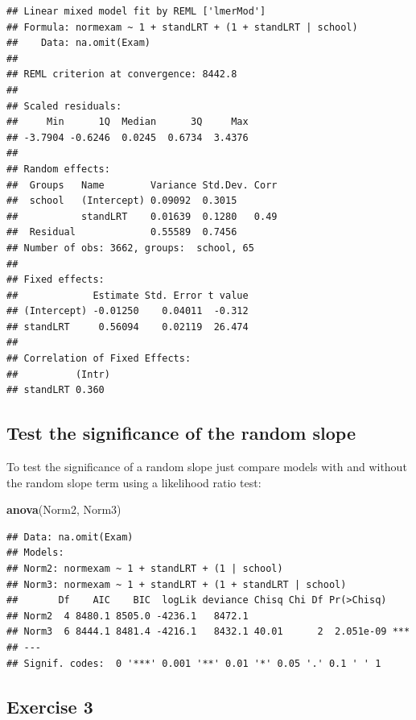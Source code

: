 \documentclass[]{book}
\newenvironment{Shaded}{\begin{snugshade}}{\end{snugshade}}
\newcommand{\KeywordTok}[1]{\textcolor[rgb]{0.13,0.29,0.53}{\textbf{#1}}}
\newcommand{\NormalTok}[1]{#1}
\begin{document}
\begin{verbatim}
## Linear mixed model fit by REML ['lmerMod']
## Formula: normexam ~ 1 + standLRT + (1 + standLRT | school)
##    Data: na.omit(Exam)
## 
## REML criterion at convergence: 8442.8
## 
## Scaled residuals: 
##     Min      1Q  Median      3Q     Max 
## -3.7904 -0.6246  0.0245  0.6734  3.4376 
## 
## Random effects:
##  Groups   Name        Variance Std.Dev. Corr
##  school   (Intercept) 0.09092  0.3015       
##           standLRT    0.01639  0.1280   0.49
##  Residual             0.55589  0.7456       
## Number of obs: 3662, groups:  school, 65
## 
## Fixed effects:
##             Estimate Std. Error t value
## (Intercept) -0.01250    0.04011  -0.312
## standLRT     0.56094    0.02119  26.474
## 
## Correlation of Fixed Effects:
##          (Intr)
## standLRT 0.360
\end{verbatim}

\hypertarget{test-the-significance-of-the-random-slope}{%
\subsection{Test the significance of the random slope}\label{test-the-significance-of-the-random-slope}}

To test the significance of a random slope just compare models with and without the random slope term using a likelihood ratio test:

\begin{Shaded}
\begin{Highlighting}[]
  \KeywordTok{anova}\NormalTok{(Norm2, Norm3) }
\end{Highlighting}
\end{Shaded}

\begin{verbatim}
## Data: na.omit(Exam)
## Models:
## Norm2: normexam ~ 1 + standLRT + (1 | school)
## Norm3: normexam ~ 1 + standLRT + (1 + standLRT | school)
##       Df    AIC    BIC  logLik deviance Chisq Chi Df Pr(>Chisq)    
## Norm2  4 8480.1 8505.0 -4236.1   8472.1                            
## Norm3  6 8444.1 8481.4 -4216.1   8432.1 40.01      2  2.051e-09 ***
## ---
## Signif. codes:  0 '***' 0.001 '**' 0.01 '*' 0.05 '.' 0.1 ' ' 1
\end{verbatim}

\hypertarget{exercise-3-1}{%
\subsection{Exercise 3}\label{exercise-3-1}}
\end{document}

